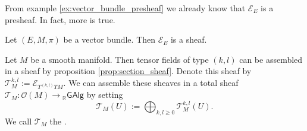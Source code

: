 From example \ref{ex:vector_bundle_presheaf} we already know that $\mathcal{E}_E$ is a presheaf. In fact, more is true.

\begin{proposition}
	\label{prop:section_sheaf}
	Let $(E,M,\pi)$ be a vector bundle. Then $\mathcal{E}_E$ is a sheaf. 
\end{proposition}

\begin{example}
	Let $M$ be a smooth manifold. Then tensor fields of type $(k,l)$ can be assembled in a sheaf by proposition \ref{prop:section_sheaf}. Denote this sheaf by $\mathcal{T}^{k,l}_M := \mathcal{E}_{T^{(k,l)}TM}$. We can assemble these sheaves in a total sheaf $\mathcal{T}_M : \mathcal{O}(M) \to {_{\mathbb{R}}}\mathsf{GAlg}$ by setting
	\begin{equation*}
		\mathcal{T}_M(U) := \bigoplus_{k,l \geq 0} \mathcal{T}^{k,l}_M(U).
	\end{equation*}
	We call $\mathcal{T}_M$ the .
\end{example}
